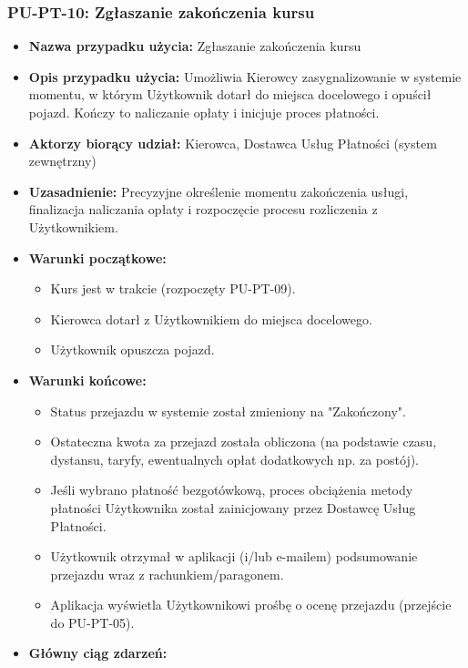 \documentclass[a4paper,12pt]{article}
\begin{document}
\subsubsection{PU-PT-10: Zgłaszanie zakończenia kursu}
\begin{itemize}
    \item \textbf{Nazwa przypadku użycia:} Zgłaszanie zakończenia kursu
    \item \textbf{Opis przypadku użycia:} Umożliwia Kierowcy zasygnalizowanie w systemie momentu, w którym Użytkownik dotarł do miejsca docelowego i opuścił pojazd. Kończy to naliczanie opłaty i inicjuje proces płatności.
    \item \textbf{Aktorzy biorący udział:} Kierowca, Dostawca Usług Płatności (system zewnętrzny)
    \item \textbf{Uzasadnienie:} Precyzyjne określenie momentu zakończenia usługi, finalizacja naliczania opłaty i rozpoczęcie procesu rozliczenia z Użytkownikiem.
    \item \textbf{Warunki początkowe:}
        \begin{itemize}
            \item Kurs jest w trakcie (rozpoczęty PU-PT-09).
            \item Kierowca dotarł z Użytkownikiem do miejsca docelowego.
            \item Użytkownik opuszcza pojazd.
        \end{itemize}
    \item \textbf{Warunki końcowe:}
        \begin{itemize}
            \item Status przejazdu w systemie został zmieniony na "Zakończony".
            \item Ostateczna kwota za przejazd została obliczona (na podstawie czasu, dystansu, taryfy, ewentualnych opłat dodatkowych np. za postój).
            \item Jeśli wybrano płatność bezgotówkową, proces obciążenia metody płatności Użytkownika został zainicjowany przez Dostawcę Usług Płatności.
            \item Użytkownik otrzymał w aplikacji (i/lub e-mailem) podsumowanie przejazdu wraz z rachunkiem/paragonem.
            \item Aplikacja wyświetla Użytkownikowi prośbę o ocenę przejazdu (przejście do PU-PT-05).
        \end{itemize}
    \item \textbf{Główny ciąg zdarzeń:}
        \begin{enumerate}

\end{enumerate}
\end{itemize}
\end{document}
